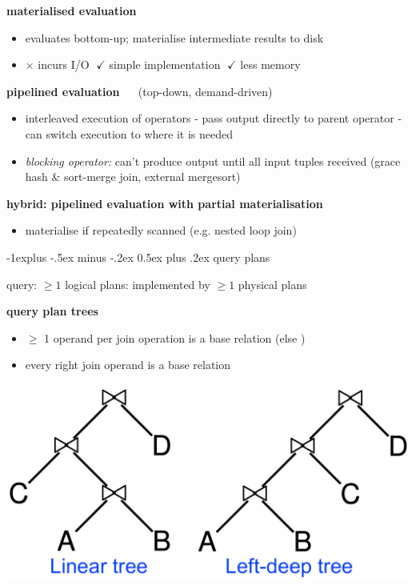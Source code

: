 \documentclass[10pt, landscape]{article}
\makeatletter
\renewcommand{\subsection}{\@startsection{subsection}{2}{0mm}%
  {-1explus -.5ex minus -.2ex}%
  {0.5ex plus .2ex}%
{\normalfont\normalsize\bfseries}}
\makeatother
\begin{document}
\begin{multicols*}{4}
  \textbf{materialised evaluation}

  \begin{itemize}
    \item evaluates bottom-up; materialise intermediate results to disk 
    \item $\times$ incurs I/O  $\;\checkmark$ simple implementation $\;\checkmark$ less memory
  \end{itemize}

  \textbf{pipelined evaluation} $\quad$ (top-down, demand-driven)

  \begin{itemize}
    \item interleaved execution of operators - pass output directly to parent operator - can switch execution to where it is needed
    \item \textit{blocking operator:} can't produce output until all input tuples received (grace hash \& sort-merge join, external mergesort)
  \end{itemize}

  \textbf{hybrid: pipelined evaluation with partial materialisation}

  \begin{itemize}
    \item materialise if repeatedly scanned (e.g. nested loop join)
  \end{itemize}

  \subsection{query plans}

  query: $\geq 1$ logical plans: implemented by $\geq 1$ physical plans

  \textbf{query plan trees}

  \begin{minipage}[c]{0.6\linewidth}\color{black}
    \begin{itemize}
      \item {} $\geq$ 1 operand per join operation is a base relation
        (else )
      \item {} every right join operand is a base relation
    \end{itemize}
  \end{minipage}
  \begin{minipage}[c]{0.36\linewidth}
    \includegraphics[width=\linewidth]{cs3223-query-plan-trees.png} 
  \end{minipage}


\end{multicols*}
\end{document}
